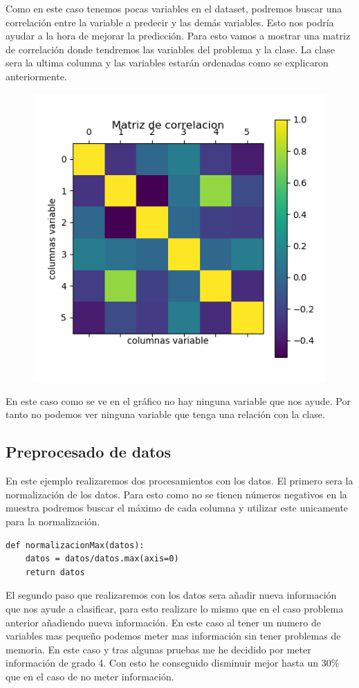 \documentclass[titlepage]{article}
\begin{document}
Como en este caso tenemos pocas variables en el dataset, podremos buscar una correlación entre la variable a predecir y las demás variables. Esto nos podría ayudar a la hora de mejorar la predicción. Para esto vamos a mostrar una matriz de correlación donde tendremos las variables del problema y la clase. La clase sera la ultima columna y las variables estarán ordenadas como se explicaron anteriormente.
\begin{figure}[H]
	\centering
	\includegraphics[width=0.7\linewidth]{screenshot010}

\end{figure}

En este caso como se ve en el gráfico no hay ninguna variable que nos ayude. Por tanto no podemos ver ninguna variable que tenga una relación con la clase. 

\subsection{Preprocesado de datos}
En este ejemplo realizaremos dos procesamientos con los datos. 
El primero sera la normalización de los datos. Para esto como no se tienen números negativos en la muestra podremos buscar el máximo de cada columna y utilizar este unicamente para la normalización.

\begin{lstlisting}
def normalizacionMax(datos):
	datos = datos/datos.max(axis=0)   
	return datos
\end{lstlisting}

El segundo paso que realizaremos con los datos sera añadir nueva información que nos ayude a clasificar, para esto realizare lo mismo que en el caso problema anterior añadiendo nueva información. En este caso al tener un numero de variables mas pequeño podemos meter mas información sin tener problemas de memoria. En este caso y tras algunas pruebas me he decidido por meter información de grado 4. Con esto he conseguido disminuir mejor hasta un 30\% que en el caso de no meter información.
\end{document}
